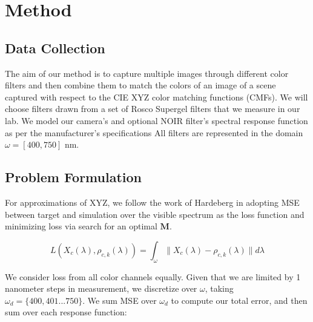 \section{Method}
\subsection{Data Collection}
The aim of our method is to capture multiple images through different color filters and then combine them to match the colors of an image of a scene captured with respect to the CIE XYZ color matching functions (CMFs). 
We will choose filters drawn from a set of Rosco Supergel filters that we measure in our lab. 
We model our camera's and optional NOIR filter's spectral response function as per the manufacturer's specifications \cite{arducam_ov9281, coligh_ircut_650nm}
All filters are represented in the domain $\omega = [400,750]$ nm. 

\subsection{Problem Formulation}

For approximations of XYZ, we follow the work of Hardeberg \cite{Filterselection} in adopting MSE between target and simulation over the visible spectrum as the loss function and minimizing loss via search for an optimal $\boldsymbol{M}$.

\begin{equation}
    L({X_c}(\lambda),{\rho}_{c,k}(\lambda)) = \int_{\omega}\|{X_c}(\lambda)-{\rho}_{c,k}(\lambda)\| d\lambda
    \label{eq:5}
\end{equation}

We consider loss from all color channels equally. Given that we are limited by 1 nanometer steps in measurement, we discretize over $\omega$, taking $\omega_d = \{400,401...750\}$. We sum MSE over $\omega_d$ to compute our total error, and then sum over each response function:


